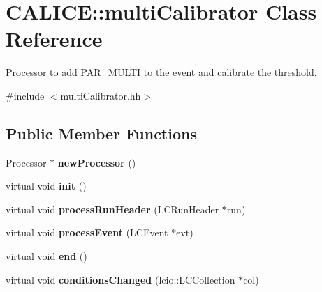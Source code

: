 \section{CALICE::multiCalibrator Class Reference}
\label{classCALICE_1_1multiCalibrator}


Processor to add PAR\_\-MULTI to the event and calibrate the threshold.  


{\ttfamily \#include $<$multiCalibrator.hh$>$}\subsection*{Public Member Functions}
\begin{DoxyCompactItemize}
\item 
Processor $\ast$ {\bfseries newProcessor} ()\label{classCALICE_1_1multiCalibrator_ad18beb97b5deccfa062ed368644fce16}

\item 
virtual void {\bfseries init} ()\label{classCALICE_1_1multiCalibrator_a8a3e419d429f42b6ea7aae4b52428ce4}

\item 
virtual void {\bfseries processRunHeader} (LCRunHeader $\ast$run)\label{classCALICE_1_1multiCalibrator_a67d14b42a9ce88fc17515613efe997bc}

\item 
virtual void {\bfseries processEvent} (LCEvent $\ast$evt)\label{classCALICE_1_1multiCalibrator_a7664b108349a27d1497d52d55001dc41}

\item 
virtual void {\bfseries end} ()\label{classCALICE_1_1multiCalibrator_a156e6823b5819c32c0c1530f9cf17787}

\item 
virtual void {\bfseries conditionsChanged} (lcio::LCCollection $\ast$col)\label{classCALICE_1_1multiCalibrator_aae74a036fde33453359d9938bacd8475}

\end{DoxyCompactItemize}
